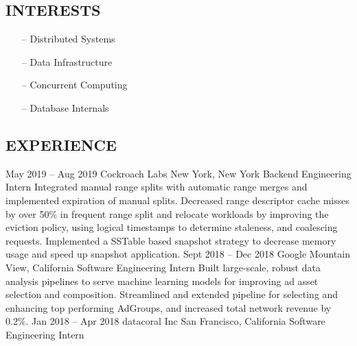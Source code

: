 \documentclass{resume}
\begin{document}
\begin{sidebar}
    \section{INTERESTS}
      \begin{itemize}[leftmargin=0.45cm, noitemsep, topsep=0.0cm]%
        \item[--] Distributed Systems
        \item[--] Data Infrastructure
        \item[--] Concurrent Computing
        \item[--] Database Internals
      \end{itemize}%
  \end{sidebar}
  \begin{main}
    \section{EXPERIENCE}
      \begin{entrylist}
        \rightentry%
          {May 2019 -- Aug 2019}%
          {Cockroach Labs}%
          {New York, New York}%
          {Backend Engineering Intern}%
          {\createlist%
            {%
              Integrated manual range splits with automatic range merges and implemented %
              expiration of manual splits. %
            }%
            {%
              Decreased range descriptor cache misses by over 50\% in frequent range split and %
              relocate workloads by improving the eviction policy, using logical timestamps to %
              determine staleness, and coalescing requests. %
            }%
            {%
              Implemented a SSTable based snapshot strategy to decrease memory usage and speed up %
              snapshot application. %
            }%
          }
        \rightentry%
          {Sept 2018 -- Dec 2018}%
          {Google}%
          {Mountain View, California}%
          {Software Engineering Intern}%
          {\createlist%
            {%
              Built large-scale, robust data analysis pipelines to serve machine learning %
              models for improving ad asset selection and composition. %
            }%
            {%
              Streamlined and extended pipeline for selecting and enhancing top performing %
              AdGroups, and increased total network revenue by 0.2\%. %
            }%
          }
        \rightentry%
          {Jan 2018 -- Apr 2018}%
          {datacoral Inc}%
          {San Francisco, California}%
          {Software Engineering Intern}%
          {\createlist%
}
\end{entrylist}
\end{main}
\end{document}
